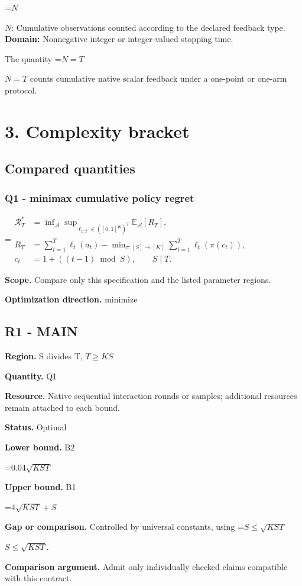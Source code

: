 \documentclass[10pt,a4paper]{article}
\newcommand{\AtlasMath}[1]{\par\begingroup\centering\setbox0=\hbox{$\displaystyle #1$}\ifdim\wd0>1.4\linewidth\typeout{ATLAS WIDE FORMULA: \the\wd0}\fi\ifdim\wd0>\linewidth\resizebox{\linewidth}{!}{\box0}\else\box0\fi\par\endgroup}
\newcommand{\AtlasInlineMath}[1]{\begingroup\setbox0=\hbox{$#1$}\ifdim\wd0>.4\linewidth\endgroup\AtlasMath{#1}\else\endgroup$#1$\fi}
\begin{document}
\AtlasInlineMath{N}: Cumulative observations counted according to the declared feedback type. \textbf{Domain:} Nonnegative integer or integer-valued stopping time.

The quantity \AtlasInlineMath{N=T} counts cumulative native scalar feedback under a one-point or one-arm protocol.

\section{3. Complexity bracket}
\subsection{Compared quantities}
\subsubsection{Q1 - minimax cumulative policy regret}
\AtlasMath{\begin{aligned}\mathcal R_T^*&=\inf_{\mathcal A}\sup_{\ell_{1:T}\in([0,1]^K)^T}\mathbb E_{\mathcal A}[R_T],\\ R_T&=\sum_{t=1}^T\ell_t(a_t)-\min_{\pi:[S]\to[K]}\sum_{t=1}^T\ell_t(\pi(c_t)),\\ c_t&=1+((t-1)\bmod S),\qquad S\mid T.\end{aligned}}
\textbf{Scope.} Compare only this specification and the listed parameter regions.

\textbf{Optimization direction.} minimize

\subsection{R1 - MAIN}
\textbf{Region.} S divides T, $T\ge KS$

\textbf{Quantity.} Q1

\textbf{Resource.} Native sequential interaction rounds or samples; additional resources remain attached to each bound.

\textbf{Status.} Optimal

\textbf{Lower bound.} B2

\AtlasMath{0.04\sqrt{KST}}
\textbf{Upper bound.} B1

\AtlasMath{4\sqrt{KST}+S}
\textbf{Gap or comparison.} Controlled by universal constants, using \AtlasInlineMath{S\le\sqrt{KST}}.

\textbf{Comparison argument.} Admit only individually checked claims compatible with this contract.
\end{document}
